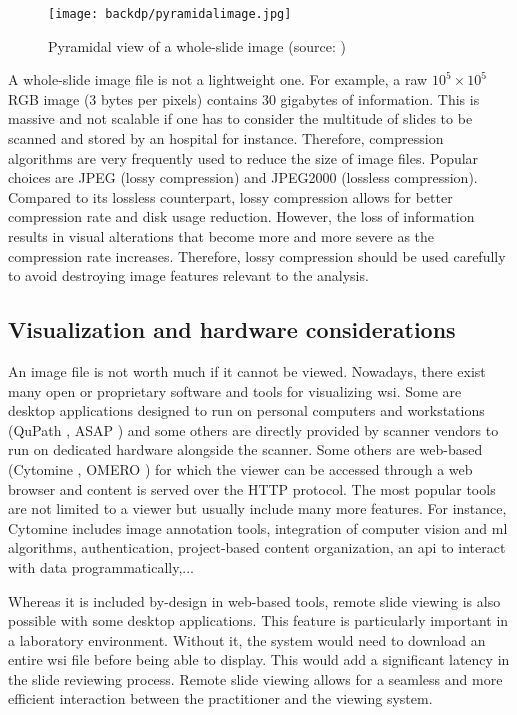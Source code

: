 \begin{figure}
  \centering
  \texttt{[image: backdp/pyramidalimage.jpg]}
  \caption{Pyramidal view of a whole-slide image (source: \cite{marini2022multi_scale_tools})}
  \label{fig:backdp:pyramidalimage}
\end{figure}

A whole-slide image file is not a lightweight one. For example, a raw $10^5 \times 10^5$ RGB image (3 bytes per pixels) contains 30 gigabytes of information. This is massive and not scalable if one has to consider the multitude of slides to be scanned and stored by an hospital for instance. Therefore, compression algorithms are very frequently used to reduce the size of image files. Popular choices are JPEG (lossy compression) and JPEG2000 (lossless compression). Compared to its lossless counterpart, lossy compression allows for better compression rate and disk usage reduction. However, the loss of information results in visual alterations that become more and more severe as the compression rate increases. Therefore, lossy compression should be used carefully to avoid destroying image features relevant to the analysis. 

\subsection{Visualization and hardware considerations}
\label{ssec:backdp:visualization}

An image file is not worth much if it cannot be viewed. Nowadays, there exist many open or proprietary software and tools for visualizing \acrshort{wsi}. Some are desktop applications designed to run on personal computers and workstations (\eg QuPath \cite{bankhead2017qupath}, ASAP \cite{cpg2022asap}) and some others are directly provided by scanner vendors to run on dedicated hardware alongside the scanner. Some others are web-based (\eg Cytomine \cite{maree2016collaborative}, OMERO \cite{allan2012omero}) for which the viewer can be accessed through a web browser and content is served over the HTTP protocol. The most popular tools are not limited to a viewer but usually include many more features. For instance, Cytomine includes image annotation tools, integration of computer vision and \acrlong{ml} algorithms, authentication, project-based content organization, an \acrshort{api} to interact with data programmatically,...

Whereas it is included by-design in web-based tools, remote slide viewing is also possible with some desktop applications. This feature is particularly important in a laboratory environment. Without it, the system would need to download an entire \acrshort{wsi} file before being able to display. This would add a significant latency in the slide reviewing process. Remote slide viewing allows for a seamless and more efficient interaction between the practitioner and the viewing system.

